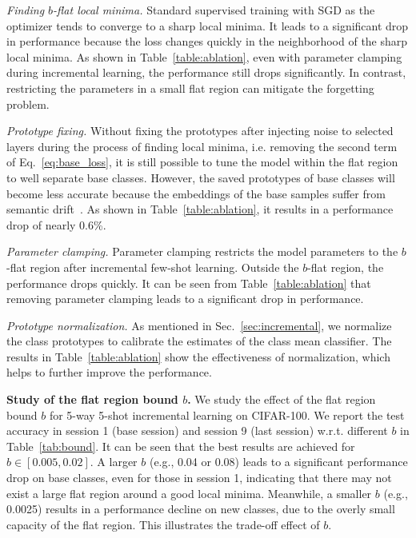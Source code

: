 \documentclass{article}
\begin{document}
\noindent
\emph{Finding $b$-flat local minima.} 
Standard supervised training with SGD as the optimizer tends to converge to a sharp local minima. It leads to a significant drop in performance because the loss changes quickly in the neighborhood of the sharp local minima. As shown in Table~\ref{table:ablation}, even with parameter clamping during incremental learning, 
the performance still drops significantly.
In contrast, restricting the parameters in a small flat region can mitigate the forgetting problem.

\noindent
\emph{Prototype fixing.}
Without fixing the prototypes after injecting noise to selected layers during the process of finding local minima, i.e. removing the second term of Eq.~\ref{eq:base_loss}, it is still possible to tune the model within the flat region to well separate base classes. However, the saved prototypes of base classes will become less accurate because 
the embeddings of the base samples suffer from semantic drift~\cite{Yu2020SemanticDC}. 
As shown in Table~\ref{table:ablation}, it results in a performance drop of nearly $0.6$\%.

\noindent
\emph{Parameter clamping.}
Parameter clamping restricts the model parameters to the ${b}$-flat region after incremental few-shot learning. Outside the ${b}$-flat region, the performance drops quickly. It can be seen from Table~\ref{table:ablation} that removing parameter clamping leads to a significant drop in performance. 


\noindent
\emph{Prototype normalization.} 
As mentioned in Sec.~\ref{sec:incremental}, we normalize the class prototypes to calibrate the estimates of the class mean classifier. 
The results in Table~\ref{table:ablation} show the effectiveness of normalization, which helps to further improve the performance.

\textbf{Study of the flat region bound $b$.} We study the effect of the flat region bound $b$ for 5-way 5-shot incremental learning on CIFAR-100. We report the test accuracy in session 1 (base session) and session 9 (last session) w.r.t. different $b$ in Table~\ref{tab:bound}. It can be seen that the best results are achieved for $b\in[0.005, 0.02]$. A larger $b$ (e.g., 0.04 or 0.08) leads to a significant performance drop on base classes, even for those in session 1, indicating that there may not exist a large flat region around a good local minima. Meanwhile, a smaller $b$ (e.g., 0.0025) results in a performance decline on new classes, due to the overly small capacity of the flat region. This illustrates the trade-off effect of $b$.
\end{document}
